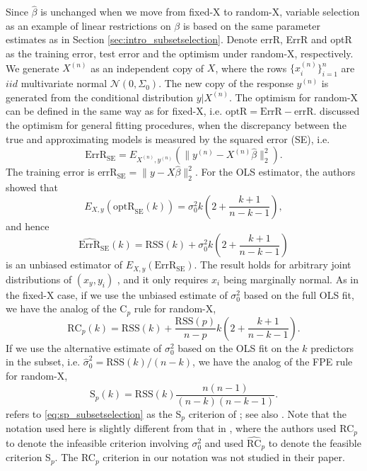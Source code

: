 Since $\hat\beta$ is unchanged when we move from fixed-X to random-X, variable selection as an example of linear restrictions on $\beta$ is based on the same parameter estimates as in Section \ref{sec:intro_subsetselection}. Denote errR, ErrR and optR as the training error, test error and the optimism under random-X, respectively. We generate $X^{(n)}$ as an independent copy of $X$, where the rows $\{x_i^{(n)}\}_{i=1}^n$ are $iid$ multivariate normal $\mathcal{N}(0,\Sigma_0)$. The new copy of the response $y^{(n)}$ is generated from the conditional distribution $y|X^{(n)}$. The optimism for random-X can be defined in the same way as for fixed-X, i.e. $\text{optR}=\text{ErrR}-\text{errR}$. \citet{rosset2020fixed} discussed the optimism for general fitting procedures, when the discrepancy between the true and approximating models is measured by the squared error (SE), i.e.
\begin{equation*}
\text{ErrR}_\text{SE} = E_{X^{(n)},y^{(n)}} \left( \lVert y^{(n)} - X^{(n)} \hat\beta \rVert_2^2 \right).
\end{equation*}
The training error is $\text{errR}_\text{SE} = \lVert y - X \hat\beta \rVert_2^2$. For the OLS estimator, the authors showed that 
\begin{equation*}
E_{X,y}(\text{optR}_\text{SE}(k)) = \sigma_0^2 k \left(2 + \frac{k+1}{n-k-1} \right),
\end{equation*}
and hence
\begin{equation*}
\widehat{\text{ErrR}}_\text{SE}(k) = \text{RSS}(k) + \sigma_0^2 k \left(2 + \frac{k+1}{n-k-1} \right)
\end{equation*}
is an unbiased estimator of $E_{X,y}(\text{ErrR}_\text{SE})$. The result holds for arbitrary joint distributions of $(x_y,y_i)$ , and it only requires $x_i$ being marginally normal. As in the fixed-X case, if we use the unbiased estimate of $\sigma_0^2$ based on the full OLS fit, we have the analog of the C$_p$ rule for random-X, 
\begin{equation}
\text{RC}_p(k) = \text{RSS}(k) + \frac{\text{RSS}(p)}{n-p} k\left(2 + \frac{k+1}{n-k-1}\right).
\label{eq:rcp_subsetselection}
\end{equation}
If we use the alternative estimate of $\sigma_0^2$ based on the OLS fit on the $k$ predictors in the subset, i.e. $\hat\sigma_0^2=\text{RSS}(k)/(n-k)$, we have the analog of the FPE rule for random-X,
\begin{equation}
\text{S}_p(k) = \text{RSS}(k)\frac{n(n-1)}{(n-k)(n-k-1)}.
\label{eq:sp_subsetselection}
\end{equation}
\citet{hocking1976biometrics} refers to \eqref{eq:sp_subsetselection} as the S$_p$ criterion of \citet{sclove1969criteria}; see also \citet{thompson1978a,thompson1978b}. Note that the notation used here is slightly different from that in \citet{rosset2020fixed}, where the authors used RC$_p$ to denote the infeasible criterion involving $\sigma_0^2$ and used $\widehat{\text{RC}}_p$ to denote the feasible criterion S$_p$. The RC$_p$ criterion in our notation was not studied in their paper. 

